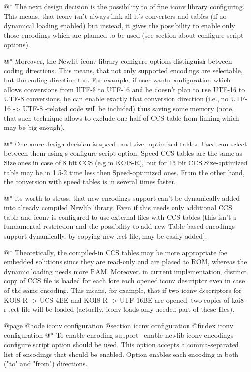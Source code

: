 @*
The next design decision is the possibility to of fine iconv library
configuring. This means, that iconv isn't always link all it's
converters and tables (if no dynamical loading enabled) but instead, it
gives the possibility to enable only those encodings which are planned
to be used (see section about configure script options).

@*
Moreover, the Newlib iconv library configure options distinguish between
coding directions. This means, that not only supported encodings are
selectable, but the coding direction too. For example, if user wants
configuration which allows conversions from UTF-8 to UTF-16 and he
doesn't plan to use UTF-16 to UTF-8 conversions, he can enable exactly
that conversion direction (i.e., no UTF-16 -> UTF-8 -related code will
be included) thus saving some memory (note, that such technique allows to
exclude one half of CCS table from linking which may be big enough).

@*
One more design decision is speed- and size- optimized tables. Used can
select between them using s configure script option. Speed CCS tables
are the same as Size ones in case of 8 bit CCS (e.g.m KOI8-R), but for 16
bit CCS Size-optimized table may be in 1.5-2 time less then
Speed-optimized ones. From the other hand, the conversion with speed
tables is in several times faster.

@*
Its worth to stress, that new encodings support can't be
dynamically added into already compiled Newlib library. Even if this
needs only additional CCS table and iconv is configured to use external
files with CCS tables (this isn't a fundamental restriction and the
possibility to add new Table-based encodings support dynamically, by
copying new .cct file, may be easily added).

@*
Theoretically, the compiled-in CCS tables may be more appropriate foe
embedded solutions since they are read-only and are placed to ROM,
whereas the dynamic loading needs more RAM. Moreover, in current
implementation, distinct copy of CCS file is loaded for each fore each
opened iconv descriptor even in case of the same encoding.
This means, for example, that if two iconv descriptors for
KOI8-R -> UCS-4BE and KOI8-R -> UTF-16BE are opened, two copies of
koi8-r .cct file will be loaded (actually, iconv loads only needed part
of these files).


@page
@node iconv configuration
@section iconv configuration
@findex iconv configuration
@*
To enable encoding support --enable-newlib-iconv-encodings configure
script option should be used. This option accepts a comma-separated list
of encodings that should be enabled. Option enables each encoding in both
("to" and "from") directions.

